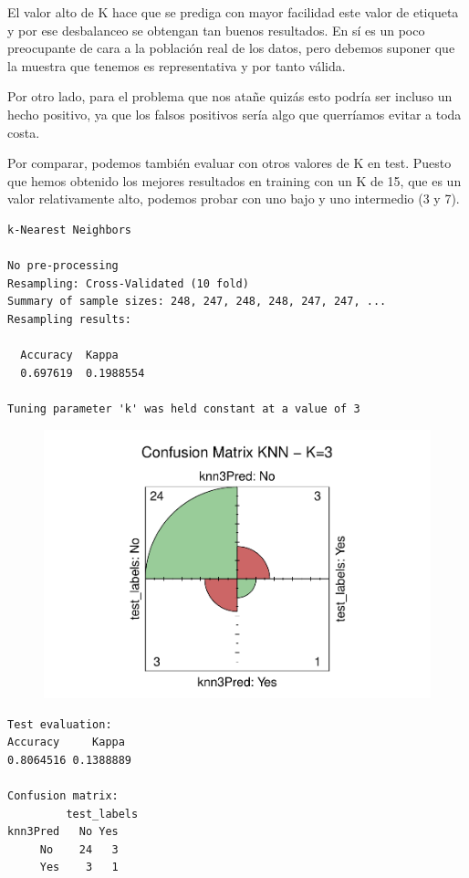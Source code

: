 El valor alto de K hace que se prediga con mayor facilidad este valor de etiqueta y por ese desbalanceo se obtengan tan buenos resultados. En sí es un poco preocupante de cara a la población real de los datos, pero debemos suponer que la muestra que tenemos es representativa y por tanto válida.

Por otro lado, para el problema que nos atañe quizás esto podría ser incluso un hecho positivo, ya que los falsos positivos sería algo que querríamos evitar a toda costa.

\vspace{\baselineskip}

Por comparar, podemos también evaluar con otros valores de K en test. Puesto que hemos obtenido los mejores resultados en training con un K de 15, que es un valor relativamente alto, podemos probar con uno bajo y uno intermedio (3 y 7).

\begin{verbatim}
k-Nearest Neighbors

No pre-processing
Resampling: Cross-Validated (10 fold) 
Summary of sample sizes: 248, 247, 248, 248, 247, 247, ... 
Resampling results:

  Accuracy  Kappa    
  0.697619  0.1988554

Tuning parameter 'k' was held constant at a value of 3
\end{verbatim}

\begin{figure}[H]\center\includegraphics[width=.9\linewidth]{img/Clasificacion_files/figure-latex/unnamed-chunk-14-1}\caption{}\end{figure}

\begin{verbatim}
Test evaluation:
Accuracy     Kappa 
0.8064516 0.1388889

Confusion matrix:
         test_labels
knn3Pred   No Yes
     No    24   3
     Yes    3   1
\end{verbatim}

